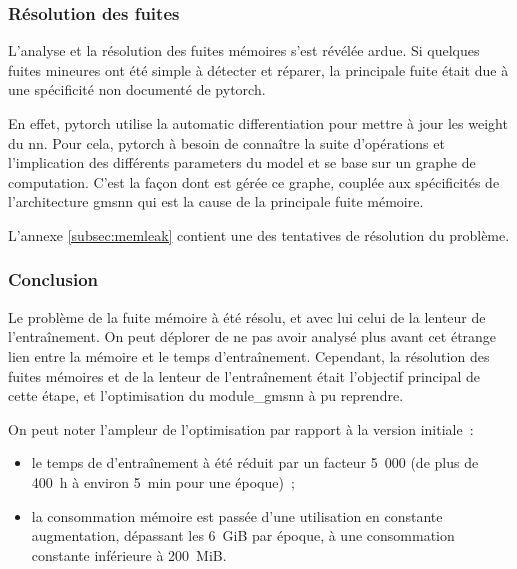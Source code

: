 \subsubsection{Résolution des fuites}
L'analyse et la résolution des fuites mémoires s'est révélée ardue. Si quelques fuites mineures ont été simple à détecter et réparer, la principale fuite était due à une spécificité non documenté de \gls{pytorch}.

En effet, \gls{pytorch} utilise la \gls{automatic differentiation} pour mettre à jour les \gls{weight} du \gls{nn}.
Pour cela, \gls{pytorch} à besoin de connaître la suite d'opérations et l'implication des différents \glspl{parameter} du \gls{model} et se base sur un \og graphe de computation\fg{}.
C'est la façon dont est gérée ce graphe, couplée aux spécificités de l'architecture \gls{gmsnn} qui est la cause de la principale fuite mémoire.

L'annexe \ref{subsec:memleak} contient une des tentatives de résolution du problème.

\subsubsection{Conclusion}
Le problème de la fuite mémoire à été résolu, et avec lui celui de la lenteur de l'entraînement.
On peut déplorer de ne pas avoir analysé plus avant cet étrange lien entre la mémoire et le temps d'entraînement.
Cependant, la résolution des fuites mémoires et de la lenteur de l'entraînement était l'objectif principal de cette étape, et l'optimisation du \gls{module_gmsnn} à pu reprendre.

On peut noter l'ampleur de l'optimisation par rapport à la version initiale~:
\begin{itemize}
	\item le temps de d'entraînement à été réduit par un facteur 5~000 (de plus de 400~h à environ 5~min pour une époque)~;
	\item la consommation mémoire est passée d'une utilisation en constante augmentation, dépassant les 6~GiB par époque, à une consommation constante inférieure à 200~MiB.
\end{itemize}